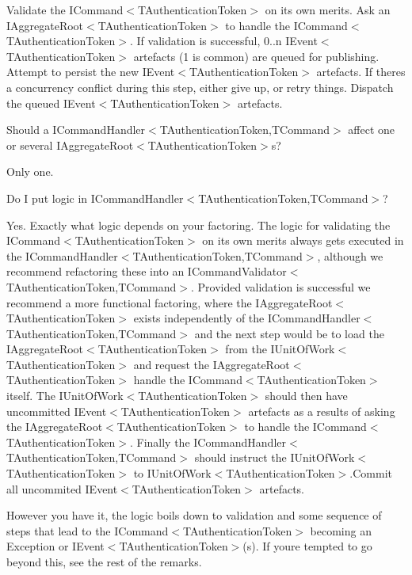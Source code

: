 Validate the I\+Command$<$\+T\+Authentication\+Token$>$ on its own merits. Ask an I\+Aggregate\+Root$<$\+T\+Authentication\+Token$>$ to handle the I\+Command$<$\+T\+Authentication\+Token$>$. If validation is successful, 0..n I\+Event$<$\+T\+Authentication\+Token$>$ artefacts (1 is common) are queued for publishing. Attempt to persist the new I\+Event$<$\+T\+Authentication\+Token$>$ artefacts. If there\textquotesingle{}s a concurrency conflict during this step, either give up, or retry things. Dispatch the queued I\+Event$<$\+T\+Authentication\+Token$>$ artefacts. 

Should a I\+Command\+Handler$<$\+T\+Authentication\+Token,\+T\+Command$>$ affect one or several I\+Aggregate\+Root$<$\+T\+Authentication\+Token$>$s?

Only one.

Do I put logic in I\+Command\+Handler$<$\+T\+Authentication\+Token,\+T\+Command$>$?

Yes. Exactly what logic depends on your factoring. The logic for validating the I\+Command$<$\+T\+Authentication\+Token$>$ on its own merits always gets executed in the I\+Command\+Handler$<$\+T\+Authentication\+Token,\+T\+Command$>$, although we recommend refactoring these into an I\+Command\+Validator$<$\+T\+Authentication\+Token,\+T\+Command$>$. Provided validation is successful we recommend a more functional factoring, where the I\+Aggregate\+Root$<$\+T\+Authentication\+Token$>$ exists independently of the I\+Command\+Handler$<$\+T\+Authentication\+Token,\+T\+Command$>$ and the next step would be to load the I\+Aggregate\+Root$<$\+T\+Authentication\+Token$>$ from the I\+Unit\+Of\+Work$<$\+T\+Authentication\+Token$>$ and request the I\+Aggregate\+Root$<$\+T\+Authentication\+Token$>$ handle the I\+Command$<$\+T\+Authentication\+Token$>$ itself. The I\+Unit\+Of\+Work$<$\+T\+Authentication\+Token$>$ should then have uncommitted I\+Event$<$\+T\+Authentication\+Token$>$ artefacts as a results of asking the I\+Aggregate\+Root$<$\+T\+Authentication\+Token$>$ to handle the I\+Command$<$\+T\+Authentication\+Token$>$. Finally the I\+Command\+Handler$<$\+T\+Authentication\+Token,\+T\+Command$>$ should instruct the I\+Unit\+Of\+Work$<$\+T\+Authentication\+Token$>$ to I\+Unit\+Of\+Work$<$\+T\+Authentication\+Token$>$.\+Commit all uncommited I\+Event$<$\+T\+Authentication\+Token$>$ artefacts.

However you have it, the logic boils down to validation and some sequence of steps that lead to the I\+Command$<$\+T\+Authentication\+Token$>$ becoming an Exception or I\+Event$<$\+T\+Authentication\+Token$>$(s). If you\textquotesingle{}re tempted to go beyond this, see the rest of the remarks.

